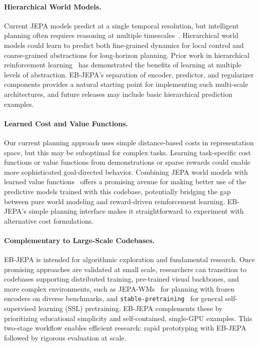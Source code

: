 \documentclass{article}
\begin{document}
\paragraph{Hierarchical World Models.}
Current JEPA models predict at a single temporal resolution, but intelligent planning often requires reasoning at multiple timescales~\citep{Schmidhuber2015,Director}.
Hierarchical world models could learn to predict both fine-grained dynamics for local control and coarse-grained abstractions for long-horizon planning.
Prior work in hierarchical reinforcement learning~\citep{HIRO,HAC} has demonstrated the benefits of learning at multiple levels of abstraction.
EB-JEPA's separation of encoder, predictor, and regularizer components provides a natural starting point for implementing such multi-scale architectures, and future releases may include basic hierarchical prediction examples.

\paragraph{Learned Cost and Value Functions.}
Our current planning approach uses simple distance-based costs in representation space, but this may be suboptimal for complex tasks.
Learning task-specific cost functions or value functions from demonstrations or sparse rewards could enable more sophisticated goal-directed behavior.
Combining JEPA world models with learned value functions~\citep{TD-MPC,TDMPC2} offers a promising avenue for making better use of the predictive models trained with this codebase, potentially bridging the gap between pure world modeling and reward-driven reinforcement learning.
EB-JEPA's simple planning interface makes it straightforward to experiment with alternative cost formulations.

\paragraph{Complementary to Large-Scale Codebases.}
EB-JEPA is intended for algorithmic exploration and fundamental research.
Once promising approaches are validated at small scale, researchers can transition to codebases supporting distributed training, pre-trained visual backbones, and more complex environments, such as JEPA-WMs~\citep{terver2026JEPAWMs} for planning with frozen encoders on diverse benchmarks, and \texttt{stable-pretraining}~\citep{balestriero2025stablepretrainingv1} for general self-supervised learning (SSL) pretraining.
EB-JEPA complements these by prioritizing educational simplicity and self-contained, single-GPU examples.
This two-stage workflow enables efficient research: rapid prototyping with EB-JEPA followed by rigorous evaluation at scale.
\end{document}
